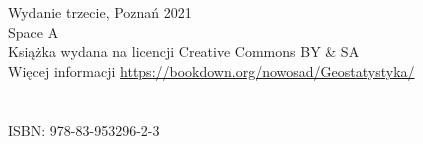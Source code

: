 \thispagestyle{empty}


\let\maketitle\oldmaketitle
\maketitle

\thispagestyle{empty}
\vspace*{\fill}
Wydanie trzecie, Poznań 2021 \\
Space A \\
Książka wydana na licencji Creative Commons BY \& SA \\
Więcej informacji \url{https://bookdown.org/nowosad/Geostatystyka/} \\
\\
\\
{\large ISBN: 978-83-953296-2-3}


